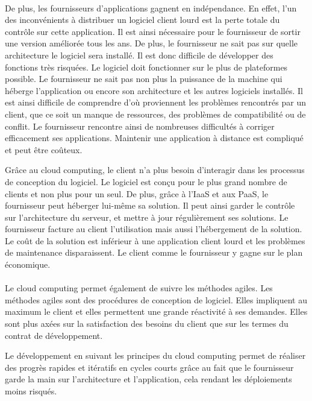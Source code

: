 \documentclass[a4paper,12pt]{report}
\begin{document}
\begin{onehalfspace}
	\paragraph*{}
	De plus, les fournisseurs d’applications gagnent en indépendance. En effet, l’un des inconvénients à distribuer un logiciel client lourd est la perte totale du contrôle sur cette application. Il est ainsi nécessaire pour le fournisseur de sortir une version améliorée tous les ans. De plus, le fournisseur ne sait pas sur quelle architecture le logiciel sera installé. Il est donc difficile de développer des fonctions très risquées. Le logiciel doit fonctionner sur le plus de plateformes possible. Le fournisseur ne sait pas non plus la puissance de la machine qui héberge l’application ou encore son architecture et les autres logiciels installés. Il est ainsi difficile de comprendre d’où proviennent les problèmes rencontrés par un client, que ce soit un manque de ressources, des problèmes de compatibilité ou de conflit. Le fournisseur rencontre ainsi de nombreuses difficultés à corriger efficacement ses applications. Maintenir une application à distance est compliqué et peut être coûteux.
	
	Grâce au cloud computing, le client n’a plus besoin d’interagir dans les processus de conception du logiciel. Le logiciel est conçu pour le plus grand nombre de clients et non plus pour un seul. De plus, grâce à l’IaaS et aux PaaS, le fournisseur peut héberger lui-même sa solution. Il peut ainsi garder le contrôle sur l’architecture du serveur, et mettre à jour régulièrement ses solutions. Le fournisseur facture au client l’utilisation mais aussi l’hébergement de la solution. Le coût de la solution est inférieur à une application client lourd et les problèmes de maintenance disparaissent. Le client comme le fournisseur y gagne sur le plan économique.
	 
	\paragraph*{}
	Le cloud computing permet également de suivre les méthodes agiles. Les méthodes agiles sont des procédures de conception de logiciel. Elles impliquent au maximum le client et elles permettent une grande réactivité à ses demandes. Elles sont plus axées sur la satisfaction des besoins du client que sur les termes du contrat de développement.
	
	Le développement en suivant les principes du cloud computing permet de réaliser des progrès rapides et itératifs en cycles courts grâce au fait que le fournisseur garde la main sur l'architecture et l'application, cela rendant les déploiements moins risqués.
	

\end{onehalfspace}
\end{document}
